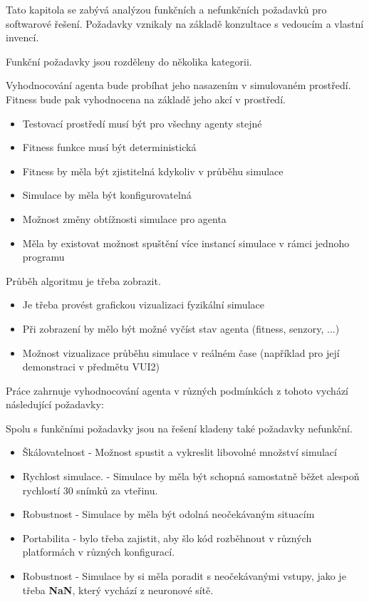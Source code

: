 Tato kapitola se zabývá analýzou funkčních a nefunkčních požadavků pro softwarové řešení. Požadavky vznikaly na základě konzultace s vedoucím a vlastní invencí.

Funkční požadavky jsou rozděleny do několika kategorii.

Vyhodnocování agenta bude probíhat jeho nasazením v simulovaném prostředí. Fitness bude pak vyhodnocena na základě jeho akcí v prostředí.
\begin{itemize}
	\item Testovací prostředí musí být pro všechny agenty stejné
	\item Fitness funkce musí být deterministická
	\item Fitness by měla být zjistitelná kdykoliv v průběhu simulace
	\item Simulace by měla být konfigurovatelná 
	\item Možnost změny obtížnosti simulace pro agenta
	\item Měla by existovat možnost spuštění více instancí simulace v rámci jednoho programu
\end{itemize}
Průběh algoritmu je třeba zobrazit.
\begin{itemize}
	\item Je třeba provést grafickou vizualizaci fyzikální simulace
	\item Při zobrazení by mělo být možné vyčíst stav agenta (fitness, senzory, ...) 
	\item Možnost vizualizace průběhu simulace v reálném čase (například pro její demonstraci v předmětu VUI2)
\end{itemize}

Práce zahrnuje vyhodnocování agenta v různých podmínkách z tohoto vychází následující požadavky:

\begin{itemize}
\end{itemize}

Spolu s funkčními požadavky jsou na řešení kladeny také požadavky nefunkční.
\begin{itemize}
	\item Škálovatelnost - Možnost spustit a vykreslit libovolné množství simulací
	\item Rychlost simulace. - Simulace by měla být schopná samostatně běžet alespoň rychlostí 30 snímků za vteřinu.
	\item Robustnost - Simulace by měla být odolná neočekávaným situacím
	\item Portabilita - bylo třeba zajistit, aby šlo kód rozběhnout v různých platformách v různých konfigurací.
	\item Robustnost - Simulace by si měla poradit s neočekávanými vstupy, jako je třeba \textbf{NaN}, který vychází z neuronové sítě.
\end{itemize}
